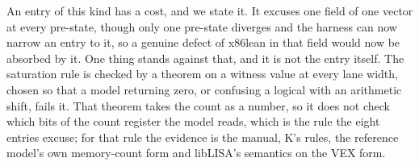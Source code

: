 \documentclass[runningheads]{llncs}
\newcommand{\src}[1]{}  %
\begin{document}
An entry of this kind has a cost, and we state it. It excuses one field of one vector at every
pre-state, though only one pre-state diverges and the harness can now narrow an entry to it, so a genuine defect of x86lean in that field would now be absorbed by it. One thing stands
against that, and it is not the entry itself. The saturation rule is checked by a theorem on a witness
value at every lane width, chosen so that a model returning zero, or confusing a logical with an
arithmetic shift, fails it. That theorem takes the count as a number, so it does not check which bits of the count register the model reads, which is the rule the eight entries excuse; for that rule the evidence is the manual, K's rules, the reference model's own memory-count form and libLISA's semantics on the VEX form.
\src{docs/DECISIONS.md D108 4; Tests/Coverage.lean vshift\_saturates\_rather\_than\_wrapping. The eight entries carry no states narrowing,
though the harness supports it since D331 (Main.lean psllw\_x and siblings); a sentence crediting the wrong models with this was cut 2026-10-14:
they show the comparator sees a planted defect, not that no real one is excused}
\end{document}
